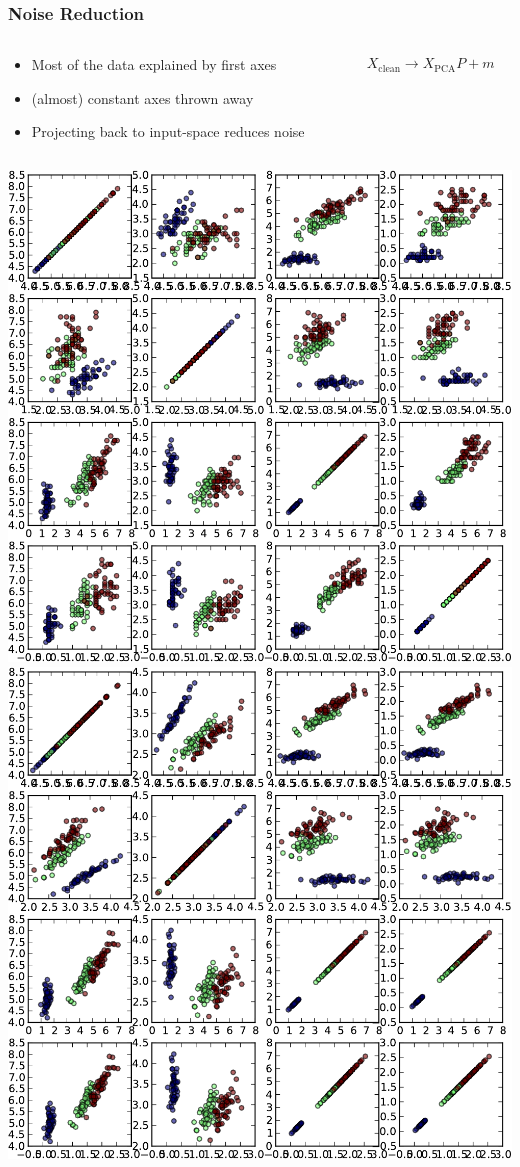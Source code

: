 \begin{frame}[fragile]
  \frametitle{Noise Reduction}
  \begin{columns}
      \begin{column}{.7\linewidth}
          \begin{itemize}
              \item Most of the data explained by first axes
              \item (almost) constant axes thrown away
              \item Projecting back to input-space reduces noise
          \end{itemize}
      \end{column}
      \begin{column}{.3\linewidth}
          \begin{align*}
              X_{\mathrm{clean}} \rightarrow X_{\mathrm{PCA}} P + m 
          \end{align*}
      \end{column}
  \end{columns}
  \begin{center}
    \includegraphics[width=.47\linewidth]{pca-pics/iris-all}\hfill%
    \includegraphics[width=.47\linewidth]{pca-pics/iris-bt}
  \end{center}
\end{frame}


